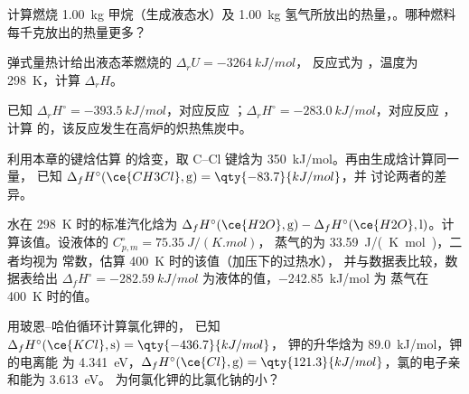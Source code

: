 \begin{exercise}[$\star$]\label{exo:b2:reaction-enthalpy:2}
计算燃烧 \qty{1.00}{kg} 甲烷（生成液态水）及
\qty{1.00}{kg} 氢气所放出的热量，。哪种燃料每千克放出的热量更多？
\end{exercise}

\begin{exercise}[$\star$]\label{exo:b2:reaction-enthalpy:3}
弹式量热计给出液态苯燃烧的 $\Delta_r U = \qty{-3264}{kJ/mol}$，
反应式为 ，温度为
\qty{298}{K}，计算 $\Delta_r H$。
\end{exercise}

\begin{exercise}[$\star$]\label{exo:b2:reaction-enthalpy:4}
已知 $\Delta_r H^\circ = \qty{-393.5}{kJ/mol}$，对应反应 ；$\Delta_r H^\circ = \qty{-283.0}{kJ/mol}$，对应反应 ，计算 
的，该反应发生在高炉的炽热焦炭中。
\end{exercise}

\begin{exercise}[$\star\star$]\label{exo:b2:reaction-enthalpy:5}
利用本章的键焓估算
的焓变，取
C--Cl 键焓为 \qty{350}{kJ/mol}。再由生成焓计算同一量，
已知 $\Delta_f H^\circ(\ce{CH3Cl}, \text{g}) = \qty{-83.7}{kJ/mol}$，并
讨论两者的差异。
\end{exercise}

\begin{exercise}[$\star\star$]\label{exo:b2:reaction-enthalpy:6}
水在 \qty{298}{K} 时的标准汽化焓为
$\Delta_f H^\circ(\ce{H2O}, \text{g}) - \Delta_f H^\circ(\ce{H2O},
\text{l})$。计算该值。设液体的 $C_{p,m}^\circ = \qty{75.35}{J/(K.mol)}$，
蒸气的为 \qty{33.59}{J/(K.mol)}，二者均视为
常数，估算 \qty{400}{K} 时的该值（加压下的过热水），
并与数据表比较，数据表给出 $\Delta_f H^\circ =
\qty{-282.59}{kJ/mol}$ 为液体的值，\qty{-242.85}{kJ/mol} 为
蒸气在 \qty{400}{K} 时的值。
\end{exercise}

\begin{exercise}[$\star\star$]\label{exo:b2:reaction-enthalpy:7}
用玻恩–哈伯循环计算氯化钾的，
已知 $\Delta_f H^\circ(\ce{KCl}, \text{s}) = \qty{-436.7}{kJ/mol}$，
钾的升华焓为 \qty{89.0}{kJ/mol}，钾的电离能
为 \qty{4.341}{eV}，$\Delta_f H^\circ(\ce{Cl}, \text{g}) =
\qty{121.3}{kJ/mol}$，氯的电子亲和能为 \qty{3.613}{eV}。
为何氯化钾的比氯化钠的小？
\end{exercise}

